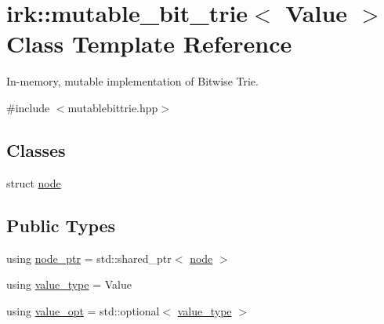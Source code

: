 \hypertarget{classirk_1_1mutable__bit__trie}{}\section{irk\+:\+:mutable\+\_\+bit\+\_\+trie$<$ Value $>$ Class Template Reference}
\label{classirk_1_1mutable__bit__trie}


In-\/memory, mutable implementation of Bitwise Trie.  




{\ttfamily \#include $<$mutablebittrie.\+hpp$>$}

\subsection*{Classes}
\begin{DoxyCompactItemize}
\item 
struct \mbox{\hyperlink{structirk_1_1mutable__bit__trie_1_1node}{node}}
\end{DoxyCompactItemize}
\subsection*{Public Types}
\begin{DoxyCompactItemize}
\item 
using \mbox{\hyperlink{classirk_1_1mutable__bit__trie_abd23179ac4f02a981d4f47b4c0652287}{node\+\_\+ptr}} = std\+::shared\+\_\+ptr$<$ \mbox{\hyperlink{structirk_1_1mutable__bit__trie_1_1node}{node}} $>$
\item 
using \mbox{\hyperlink{classirk_1_1mutable__bit__trie_a398f85c4065b746e6ab10842981a9bf4}{value\+\_\+type}} = Value
\item 
using \mbox{\hyperlink{classirk_1_1mutable__bit__trie_a7a1b77766d10fe2d02bb2ce01983f153}{value\+\_\+opt}} = std\+::optional$<$ \mbox{\hyperlink{classirk_1_1mutable__bit__trie_a398f85c4065b746e6ab10842981a9bf4}{value\+\_\+type}} $>$
\end{DoxyCompactItemize}
